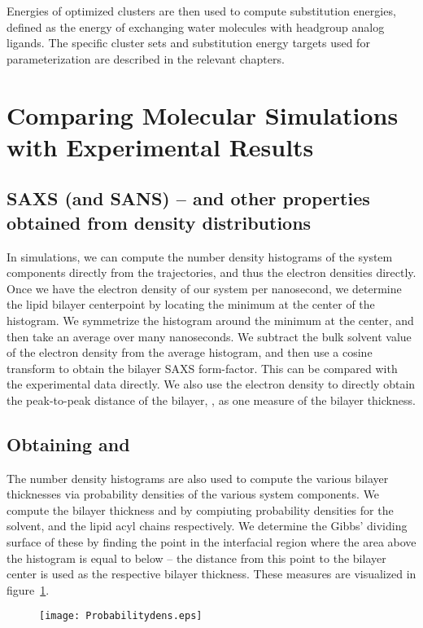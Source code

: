 Energies of optimized clusters are then used to compute substitution
energies, defined as the energy of exchanging water molecules
with headgroup analog ligands. The specific cluster sets and substitution
energy targets used for parameterization are described in the relevant
chapters.

\section{Comparing Molecular Simulations with Experimental Results}
\subsection{SAXS (and SANS) -- and other properties obtained from density distributions}
In simulations, we can compute the number density histograms of the system components
directly from the trajectories, and thus the electron densities directly. Once we have the electron density of our system
per nanosecond, we determine the lipid bilayer centerpoint by locating the minimum at the center of the 
histogram. We symmetrize the histogram around the minimum at the center, and then take an average over many nanoseconds.
We subtract the bulk solvent value of the electron density from the average histogram, and then use a cosine transform
to obtain the bilayer SAXS form-factor. This can be compared with the experimental data directly.
We also use the electron density to directly obtain the peak-to-peak distance of the bilayer, \dhh{}, as one measure
of the bilayer thickness.
\subsection{Obtaining \db{} and \dc{}}
The number density histograms are also used to compute the various bilayer thicknesses via probability densities
of the various system components. We compute the bilayer thickness \db{} and \dc{} by compiuting probability densities
for the solvent, and the lipid acyl chains respectively. We determine the Gibbs' dividing surface of these by finding the point in the interfacial region
where the area above the histogram is equal to below -- the distance from this point to the bilayer center is used as the respective bilayer thickness.
These measures are visualized in figure~\ref{figch1:thicknesses}.
\begin{figure}[h!tb]
    \caption{ }
    \label{figch1:thicknesses}
    \texttt{[image: Probabilitydens.eps]}
\end{figure}
